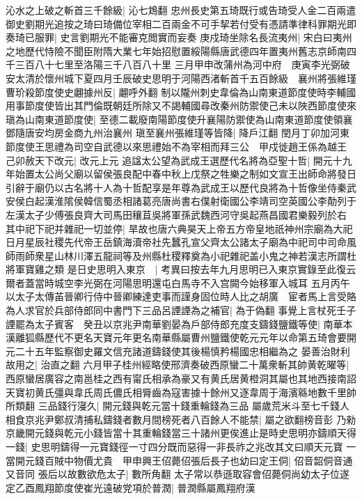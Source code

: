 沁水之上破之斬首三千餘級|{
	沁七鴆翻}
忠州長史第五琦既行或告琦受人金二百兩遣御史劉期光追按之琦曰琦備位宰相二百兩金不可手挈若付受有憑請準律科罪期光即奏琦已服罪|{
	史言劉期光不能審克閲實而妄奏}
庚戍琦坐除名長流夷州|{
	宋白曰夷州之地歷代恃險不聞臣附隋大業七年始招慰置綏陽縣唐武德四年置夷州舊志京師南四千三百八十七里至洛陽三千八百八十里}
三月甲申改蒲州為河中府　庚寅李光弼破安太清於懷州城下夏四月壬辰破史思明于河陽西渚斬首千五百餘級　襄州將張維瑾曹玠殺節度使史翽據州反|{
	翽呼外翻}
制以隴州刺史韋倫為山南東道節度使時李輔國用事節度使皆出其門倫既朝廷所除又不謁輔國尋改秦州防禦使己未以陜西節度使來瑱為山南東道節度使|{
	至德二載廢南陽節度使升襄陽防禦使為山南東道節度使領襄鄧隨唐安均房金商九州治襄州}
瑱至襄州張維瑾等皆降|{
	降戶江翻}
閏月丁卯加河東節度使王思禮為司空自武德以來思禮始不為宰相而拜三公　甲戍徙趙王係為越王　己卯赦天下改元|{
	改元上元}
追諡太公望為武成王選歷代名將為亞聖十哲|{
	開元十九年始置太公尚父廟以留侯張良配中春中秋上戊祭之牲樂之制如文宣王出師命將發日引辭于廟仍以古名將十人為十哲配享是年尊為武成王以歷代良將為十哲像坐侍秦武安侯白起漢淮隂侯韓信蜀丞相諸葛亮唐尚書右僕射衛國公李靖司空英國公李勣列于左漢太子少傅張良齊大司馬田穰苴吳將軍孫武魏西河守吳起燕昌國君樂毅列於右}
其中祀下祀并雜祀一切並停|{
	旱故也唐六典昊天上帝五方帝皇地祇神州宗廟為大祀日月星辰社稷先代帝王岳鎮海瀆帝社先蠶孔宣父齊太公諸太子廟為中祀司中司命風師雨師衆星山林川澤五龍祠等及州縣杜稷釋奠為小祀雜祀盖小鬼之神若漢志所謂杜將軍寶雞之類}
是日史思明入東京　|{
	考異曰按去年九月思明已入東京實錄至此復云爾者蓋當時城空李光弼在河陽思明還屯白馬寺不入宫闕今始移軍入城耳}
五月丙午以太子太傳苖晉卿行侍中晉卿練達吏事而謹身固位時人比之胡廣　宦者馬上言受賂為人求官於兵部侍郎同中書門下三品呂諲諲為之補官|{
	為于偽翻}
事覺上言杖死壬子諲罷為太子賓客　癸丑以京兆尹南華劉晏為戶部侍郎充度支鑄錢鹽鐵等使|{
	南華本漢離狐縣歷代不更名天寶元年更名南華縣屬曹州鹽鐵使乾元元年以命第五琦會要開元二十五年監察御史羅文信充諸道鑄錢使其後楊慎矜楊國忠相繼為之}
晏善治財利故用之|{
	治直之翻}
六月甲子桂州經略使邢濟奏破西原蠻二十萬衆斬其帥黄乾曜等|{
	西原蠻居廣容之南邕桂之西有甯氏相承為豪又有黄氏居黄橙洞其屬也其地西接南詔天寶初黄氏彊與韋氏周氏儂氏相脣齒為寇害據十餘州又逐韋周于海濱緜地數千里帥所類翻}
三品錢行寖久|{
	開元錢與乾元當十錢重輪錢為三品}
屬歲荒米斗至七千錢人相食京兆尹鄭叔清捕私鑄錢者數月間榜死者八百餘人不能禁|{
	屬之欲翻榜音彭}
乃勑京畿開元錢與乾元小錢皆當十其重輪錢當三十諸州更俟進止是時史思明亦鑄順天得一錢|{
	史思明鑄得一元寶錢徑一寸四分既而惡得一非長祚之兆改其文曰順天元寶}
一當開元錢百賊中物價尤貴　甲申興王佋薨佋張后長子也幼曰定王侗|{
	佋音韶侗音通又音同}
張后以故數欲危太子|{
	數所角翻}
太子常以恭遜取容會佋薨侗尚幼太子位遂定乙酉鳳翔節度使崔光遠破党項於普潤|{
	普潤縣屬鳳翔府漢}


